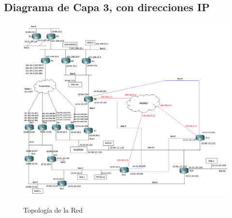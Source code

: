 \newpage
\subsection{Diagrama de Capa 3, con direcciones IP}
\begin{figure}[h!]
\centering
\includegraphics[width=\textwidth]{DiagramaCapa3conIPs.png}
\label{topologia}
\caption{Topología de la Red}
\end{figure}